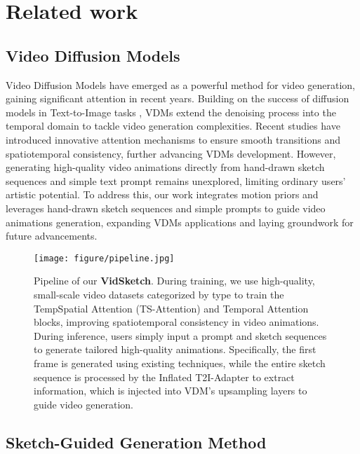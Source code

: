 \section{Related work}
\subsection{Video Diffusion Models}
Video Diffusion Models  \cite{shi2024bivdiff,qing2024hierarchical,yuan2024instructvideo,chen2023control,guo2023animatediff} have emerged as a powerful method for video generation, gaining significant attention in recent years. Building on the success of diffusion models in Text-to-Image tasks \cite{li2024generative,liang2024rich,hollein2024viewdiff,ding2024freecustom,zhang2024pia}, VDMs extend the denoising process into the temporal domain to tackle video generation complexities. Recent studies \cite{xing2024simda,wu2023lamp,li2024vidtome} have introduced innovative attention mechanisms to ensure smooth transitions and spatiotemporal consistency, further advancing VDMs development. However, generating high-quality video animations directly from hand-drawn sketch sequences and simple text prompt remains unexplored, limiting ordinary users' artistic potential. To address this, our work integrates motion priors and leverages hand-drawn sketch sequences and simple prompts to guide video animations generation, expanding VDMs applications and laying groundwork for future advancements.



\begin{figure*}[!t]
\vskip 0.05in
\begin{center}
\texttt{[image: figure/pipeline.jpg]}
\vskip -0.05in
\caption{Pipeline of our \textbf{VidSketch}. During training, we use high-quality, small-scale video datasets categorized by type to train the TempSpatial Attention (TS-Attention) and Temporal Attention blocks, improving spatiotemporal consistency in video animations. During inference, users simply input a prompt and sketch sequences to generate tailored high-quality animations. Specifically, the first frame is generated using existing techniques, while the entire sketch sequence is processed by the Inflated T2I-Adapter \cite{mou2024t2i} to extract information, which is injected into VDM's upsampling layers to guide video generation.}
\label{fig:3}
\end{center}
\vskip -0.15in
\end{figure*}

\subsection{Sketch-Guided Generation Method}

